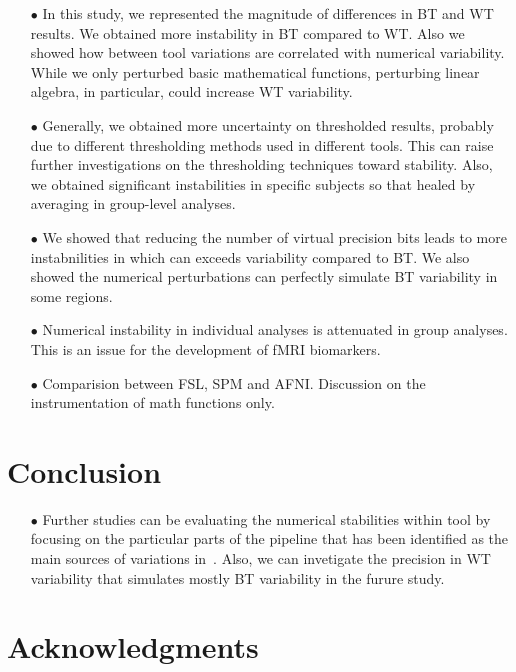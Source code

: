 \documentclass[conference]{IEEEtran}
\begin{document}
\begin{itemize}

  \item[$\bullet$ ] In this study, we represented the magnitude of differences in BT and WT results.
  We obtained more instability in BT compared to WT. Also we showed how between tool variations
  are correlated with numerical variability.
  While we only perturbed basic mathematical functions, perturbing linear algebra, in particular, could increase WT variability.

  \item[$\bullet$ ] Generally, we obtained more uncertainty on thresholded results, probably due to different thresholding
  methods used in different tools. This can raise further investigations on the thresholding techniques toward stability.
  Also, we obtained significant instabilities in specific subjects so that healed by averaging in group-level analyses.

  \item[$\bullet$ ] We showed that reducing the number of virtual precision bits leads to more instabnilities in which can exceeds variability compared to BT.
  We also showed the numerical perturbations can perfectly simulate BT variability in some regions. 
   
  \item[$\bullet$] Numerical instability in individual analyses is attenuated in group analyses. This is an issue for the development of fMRI biomarkers.
  \item[$\bullet$] Comparision between FSL, SPM and AFNI. Discussion on the instrumentation of math functions only.
\end{itemize}




\section{Conclusion}

\begin{itemize}

    \item[$\bullet$ ] Further studies can be evaluating the numerical stabilities within tool by focusing on the particular parts of
    the pipeline that has been identified as the main sources of variations in~\cite{bowring2021isolating}.
    Also, we can invetigate the precision in WT variability that simulates mostly BT variability in the furure study.

\end{itemize}


\section{Acknowledgments}




\end{document}
